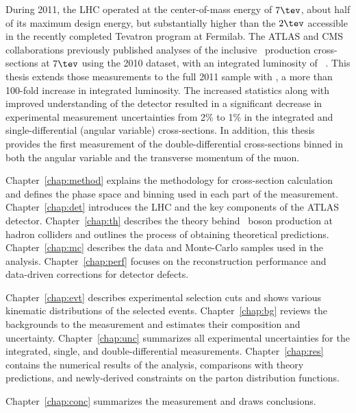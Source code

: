During 2011, the LHC operated at the center-of-mass energy of $7\tev$, about half of its maximum design energy, but substantially higher than the $2\tev$ accessible in the recently completed Tevatron program at Fermilab. The ATLAS and CMS collaborations previously published analyses of the inclusive \Wboson\ production cross-sections at $7\tev$ using the 2010 dataset, with an integrated luminosity of \lumioldtr~\cite{Aad:2011dm,CMS:2011aa}. This thesis extends those measurements to the full 2011 sample with \lumitr, a more than 100-fold increase in integrated luminosity. The increased statistics along with improved understanding of the detector resulted in a significant decrease in experimental measurement uncertainties from 2\% to 1\% in the integrated and single-differential (angular variable) cross-sections. In addition, this thesis provides the first measurement of the double-differential cross-sections binned in both the angular variable and the transverse momentum of the muon.

Chapter~\ref{chap:method} explains the methodology for cross-section calculation and defines the phase space and binning used in each part of the measurement. Chapter~\ref{chap:det} introduces the LHC and the key components of the ATLAS detector. Chapter~\ref{chap:th} describes the theory behind \Wboson\ boson production at hadron colliders and outlines the process of obtaining theoretical predictions. Chapter~\ref{chap:mc} describes the data and Monte-Carlo samples used in the analysis. Chapter~\ref{chap:perf} focuses on the reconstruction performance and data-driven corrections for detector defects.

Chapter~\ref{chap:evt} describes experimental selection cuts and shows various kinematic distributions of the selected events. Chapter~\ref{chap:bg} reviews the backgrounds to the measurement and estimates their composition and uncertainty. Chapter~\ref{chap:unc} summarizes all experimental uncertainties for the integrated, single, and double-differential measurements. Chapter~\ref{chap:res} contains the numerical results of the analysis, comparisons with theory predictions, and newly-derived constraints on the parton distribution functions.

Chapter~\ref{chap:conc} summarizes the measurement and draws conclusions.
